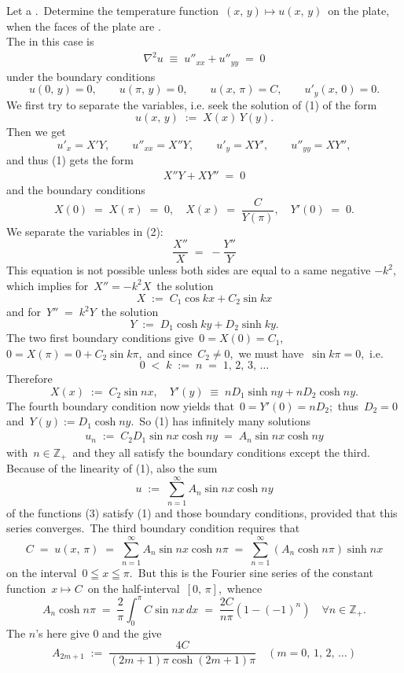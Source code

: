 \documentclass[12pt]{article}
\theoremstyle{definition}
\begin{document}
Let a .\, Determine the temperature function\, $(x,\,y)\mapsto u(x,\,y)$\, on the plate, when the faces of the plate are .\\

The  in this  case is
\begin{align}
\nabla^2 u \;\equiv\; u''_{xx}+u''_{yy} \;=\; 0
\end{align}
under the boundary conditions
$$u(0,\,y) = 0, \qquad u(\pi,\,y) = 0, \qquad u(x,\,\pi) = C, 
\qquad u'_y(x,\,0) = 0.$$
We first try to separate the variables, i.e. seek the solution of (1) of the form
$$u(x,\,y) \;:=\; X(x)\,Y(y).$$
Then we get
$$u'_x = X'Y, \qquad u''_{xx} = X''Y, \qquad u'_y = XY', 
\qquad u''_{yy} = XY'',$$
and thus (1) gets the form
\begin{align}
X''Y+XY'' \;=\; 0
\end{align}
and the boundary conditions
$$X(0) \;=\; X(\pi) \;=\; 0, \quad X(x) \;=\; \frac{C}{Y(\pi)}, \quad Y'(0) \;=\; 0.$$
We separate the variables in (2):
$$\frac{X''}{X} \;=\; -\frac{Y''}{Y}$$
This equation is not possible unless both sides are equal to a same negative  $-k^2$, which implies for\, $X'' = -k^2X$\, the solution
$$X \;:=\; C_1\cos{kx}+C_2\sin{kx}$$
and for\, $Y'' \;=\; k^2Y$\, the solution
$$Y \;:=\; D_1\cosh{ky}+D_2\sinh{ky}.$$
The two first boundary conditions give\, $0 = X(0) = C_1$,\, $0 = X(\pi) = 0+C_2\sin{k\pi}$,\, and since\, $C_2 \ne 0$,\, we must have\, $\sin{k\pi} = 0$,\, i.e.
$$0 \;<\; k \;:=\; n \;=\; 1,\,2,\,3,\,\ldots$$
Therefore 
$$X(x) \;:=\; C_2\sin{nx}, \quad Y'(y) \;\equiv\; nD_1\sinh{ny}+nD_2\cosh{ny}.$$
The fourth boundary condition now yields that\, $0 = Y'(0) = nD_2$;\,
thus\, $D_2 = 0$\, and\, $Y(y) := D_1\cosh{ny}.$\, So (1) has infinitely many solutions
\begin{align}
u_n \;:=\; C_2D_1\sin{nx}\cosh{ny} \;=\; A_n\sin{nx}\cosh{ny}
\end{align}
with\, $n\in\mathbb{Z}_+$\, and they all satisfy the boundary conditions except the third.\, Because of the linearity of (1), also the sum 
$$u \;:=\; \sum_{n=1}^\infty A_n\sin{nx}\cosh{ny}$$
of the functions (3) satisfy (1) and those boundary conditions, provided that this series converges.\, The third boundary condition requires that
$$C \;=\; u(x,\,\pi) \;=\; \sum_{n=1}^\infty A_n\sin{nx}\cosh{n\pi} \;=\;
    \sum_{n=1}^\infty(A_n\cosh{n\pi})\sinh{nx}$$
on the interval\, $0 \leqq x \leqq \pi$.\, But this is the Fourier sine series of the constant function\, $x \mapsto C$\, on the half-interval\, $[0,\,\pi]$,\, whence 
$$A_n\cosh{n\pi} \;=\; \frac{2}{\pi}\int_0^\pi C\sin{nx}\,dx \;=\; 
  \frac{2C}{n\pi}(1\!-\!(-1)^n) \quad \forall n\in\mathbb{Z}_+.$$
The  $n$'s here give 0 and the  give
$$A_{2m+1} \;:=\; \frac{4C}{(2m\!+\!1)\pi\cosh(2m\!+\!1)\pi}
\quad (m = 0,\,1,\,2,\,\ldots)$$
\end{document}

